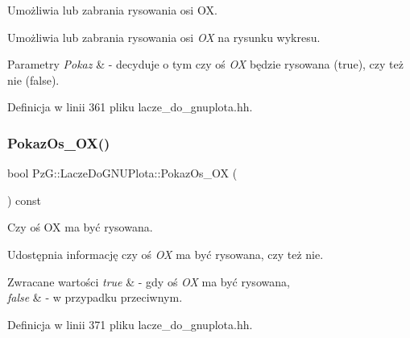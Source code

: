 Umożliwia lub zabrania rysowania osi OX. 

Umożliwia lub zabrania rysowania osi {\itshape OX} na rysunku wykresu. 
\begin{DoxyParams}{Parametry}
{\em Pokaz} & -\/ decyduje o tym czy oś {\itshape OX} będzie rysowana ({\ttfamily true}), czy też nie ({\ttfamily false}). \\
\hline
\end{DoxyParams}


Definicja w linii 361 pliku lacze\+\_\+do\+\_\+gnuplota.\+hh.

\mbox{\label{class_pz_g_1_1_lacze_do_g_n_u_plota_ae112972af57167c3b053bf922bce6bbf}} 
\subsubsection{\texorpdfstring{Pokaz\+Os\+\_\+\+O\+X()}{PokazOs\_OX()}\hspace{0.1cm}{\footnotesize\ttfamily [2/2]}}
{\footnotesize\ttfamily bool Pz\+G\+::\+Lacze\+Do\+G\+N\+U\+Plota\+::\+Pokaz\+Os\+\_\+\+OX (\begin{DoxyParamCaption}{ }\end{DoxyParamCaption}) const\hspace{0.3cm}{\ttfamily [inline]}}



Czy oś OX ma być rysowana. 

Udostępnia informację czy oś {\itshape OX} ma być rysowana, czy też nie. 
\begin{DoxyRetVals}{Zwracane wartości}
{\em true} & -\/ gdy oś {\itshape OX} ma być rysowana, \\
\hline
{\em false} & -\/ w przypadku przeciwnym. \\
\hline
\end{DoxyRetVals}


Definicja w linii 371 pliku lacze\+\_\+do\+\_\+gnuplota.\+hh.

\mbox{\label{class_pz_g_1_1_lacze_do_g_n_u_plota_a7c3db909b266fc30808e86406c04b516}} 
